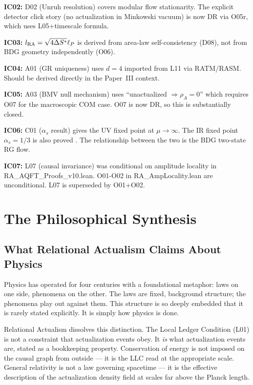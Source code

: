\documentclass[12pt,a4paper]{article}
\begin{document}
\textbf{IC02:} D02 (Unruh resolution) covers modular flow stationarity.  The explicit detector click story (no actualization in Minkowski vacuum) is now DR via O05r, which uses L05+timescale formula.

\textbf{IC03:} $l_{\rm RA}=\sqrt{4\Delta S^*}\ell_P$ is derived from area-law self-consistency (D08), not from BDG geometry independently (O06).

\textbf{IC04:} A01 (GR uniqueness) uses $d=4$ imported from L11 via RATM/RASM.  Should be derived directly in the Paper~III context.

\textbf{IC05:} A03 (BMV null mechanism) uses ``unactualized $\Rightarrow \rho_A=0$'' which requires O07 for the macroscopic COM case.  O07 is now DR, so this is substantially closed.

\textbf{IC06:} C01 ($\alpha_s$ result) gives the UV fixed point at $\mu\to\infty$.  The IR fixed point $\alpha_s=1/3$ is also proved \statusCV.  The relationship between the two is the BDG two-state RG flow.

\textbf{IC07:} L07 (causal invariance) was conditional on amplitude locality in RA\_AQFT\_Proofs\_v10.lean.  O01-O02 in RA\_AmpLocality.lean are unconditional.  L07 is superseded by O01+O02.

\section{The Philosophical Synthesis}\label{sec:philosophy}

\subsection{What Relational Actualism Claims About Physics}

Physics has operated for four centuries with a foundational metaphor: laws on one side, phenomena on the other.  The laws are fixed, background structure; the phenomena play out against them.  This structure is so deeply embedded that it is rarely stated explicitly.  It is simply how physics is done.

Relational Actualism dissolves this distinction.  The Local Ledger Condition (L01) is not a constraint that actualization events obey.  It \emph{is} what actualization events are, stated as a bookkeeping property.  Conservation of energy is not imposed on the causal graph from outside --- it is the LLC read at the appropriate scale.  General relativity is not a law governing spacetime --- it is the effective description of the actualization density field at scales far above the Planck length.
\end{document}
